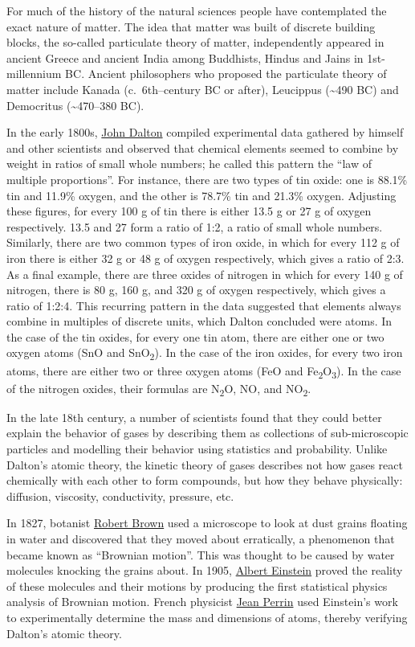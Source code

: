 For much of the history of the natural sciences people have contemplated
the exact nature of matter. The idea that matter was built of discrete
building blocks, the so-called particulate theory of matter,
independently appeared in ancient Greece and ancient India among
Buddhists, Hindus and Jains in 1st-millennium BC. Ancient philosophers
who proposed the particulate theory of matter include Kanada
(c.~6th--century BC or after), Leucippus (\textasciitilde490 BC) and
Democritus (\textasciitilde470--380 BC).

In the early 1800s,
\href{https://en.wikipedia.org/wiki/John_Dalton}{John Dalton} compiled
experimental data gathered by himself and other scientists and observed
that chemical elements seemed to combine by weight in ratios of small
whole numbers; he called this pattern the ``law of multiple
proportions''. For instance, there are two types of tin oxide: one is
88.1\% tin and 11.9\% oxygen, and the other is 78.7\% tin and 21.3\%
oxygen. Adjusting these figures, for every 100 g of tin there is either
13.5 g or 27 g of oxygen respectively. 13.5 and 27 form a ratio of 1:2,
a ratio of small whole numbers. Similarly, there are two common types of
iron oxide, in which for every 112 g of iron there is either 32 g or 48
g of oxygen respectively, which gives a ratio of 2:3. As a final
example, there are three oxides of nitrogen in which for every 140 g of
nitrogen, there is 80 g, 160 g, and 320 g of oxygen respectively, which
gives a ratio of 1:2:4. This recurring pattern in the data suggested
that elements always combine in multiples of discrete units, which
Dalton concluded were atoms. In the case of the tin oxides, for every
one tin atom, there are either one or two oxygen atoms (SnO and
SnO\textsubscript{2}). In the case of the iron oxides, for every two
iron atoms, there are either two or three oxygen atoms (FeO and
Fe\textsubscript{2}O\textsubscript{3}). In the case of the nitrogen
oxides, their formulas are N\textsubscript{2}O, NO, and
NO\textsubscript{2}.

In the late 18th century, a number of scientists found that they could
better explain the behavior of gases by describing them as collections
of sub-microscopic particles and modelling their behavior using
statistics and probability. Unlike Dalton's atomic theory, the kinetic
theory of gases describes not how gases react chemically with each other
to form compounds, but how they behave physically: diffusion, viscosity,
conductivity, pressure, etc.

In 1827, botanist
\href{https://en.wikipedia.org/wiki/Robert_Brown_(botanist,_born_1773)}{Robert
Brown} used a microscope to look at dust grains floating in water and
discovered that they moved about erratically, a phenomenon that became
known as ``Brownian motion''. This was thought to be caused by water
molecules knocking the grains about. In 1905,
\href{https://en.wikipedia.org/wiki/Albert_Einstein}{Albert Einstein}
proved the reality of these molecules and their motions by producing the
first statistical physics analysis of Brownian motion. French physicist
\href{https://en.wikipedia.org/wiki/Jean_Baptiste_Perrin}{Jean Perrin}
used Einstein's work to experimentally determine the mass and dimensions
of atoms, thereby verifying Dalton's atomic theory.

